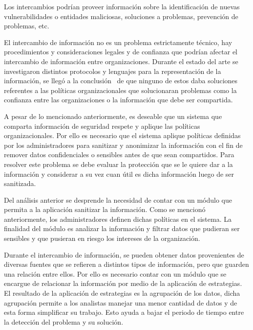 \documentclass[11pt]{article}
\begin{document}
{
Los intercambios podrían proveer información sobre la identificación de nuevas vulnerabilidades o entidades maliciosas,
soluciones a problemas, prevención de problemas, etc. }


\bigskip

{
El intercambio de información no es un problema estrictamente técnico, hay procedimientos y consideraciones legales y de
confianza que podrían afectar el intercambio de información entre organizaciones. Durante el estado del arte se
investigaron distintos protocolos y lenguajes para la representación de la información, se llegó a la conclusión \ de
que ninguno de estos daba soluciones referentes a las políticas organizacionales que solucionaran problemas como la
confianza entre las organizaciones o la información que debe ser compartida.}


\bigskip

{
A pesar de lo mencionado anteriormente, es deseable que un sistema que comparta información de seguridad respete y
aplique las políticas organizacionales. Por ello es necesario que el sistema aplique políticas definidas por los
administradores para sanitizar y anonimizar la información con el fin de remover datos confidenciales o sensibles antes
de que sean compartidos. Para resolver este problema se debe evaluar la protección que se le quiere dar a la
información y considerar a su vez cuan útil es dicha información luego de ser sanitizada.}

{
Del análisis anterior se desprende la necesidad de contar con un módulo que permita a la aplicación sanitizar la
información. Como se mencionó anteriormente, los administradores definen dichas políticas en el sistema. La finalidad
del módulo es analizar la información y filtrar datos que pudieran ser sensibles y que pusieran en riesgo los intereses
de la organización.}


\bigskip

{
Durante el intercambio de información, se pueden obtener datos provenientes de diversas fuentes que se refieren a
distintos tipos de información, pero que guarden una relación entre ellos. Por ello es necesario contar con un módulo
que se encargue de relacionar la información por medio de la aplicación de estrategias. El resultado de la aplicación
de estrategias es la agrupación de los datos, dicha agrupación permite a los analistas manejar una menor cantidad de
datos y de esta forma simplificar su trabajo. Esto ayuda a bajar el periodo de tiempo entre la detección del problema y
su solución.}
\end{document}
